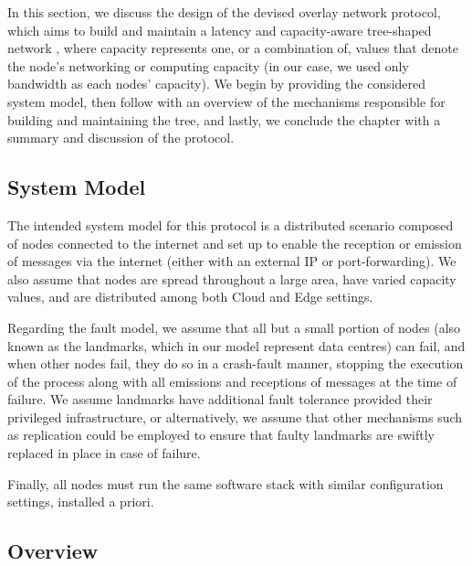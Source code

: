 


In this section, we discuss the design of the devised overlay network protocol, which aims to build and maintain a latency and capacity-aware tree-shaped network , where capacity represents one, or a combination of, values that denote the node's networking or computing capacity (in our case, we used only bandwidth as each nodes' capacity). We begin by providing the considered system model, then follow with an overview of the mechanisms responsible for building and maintaining the tree, and lastly, we conclude the chapter with a summary and discussion of the protocol.

\subsection{System Model}

The intended system model for this protocol is a distributed scenario composed of nodes connected to the internet and set up to enable the reception or emission of messages via the internet (either with an external IP or port-forwarding). We also assume that nodes are spread throughout a large area, have varied capacity values, and are distributed among both Cloud and Edge settings.

Regarding the fault model, we assume that all but a small portion of nodes (also known as the landmarks, which in our model represent data centres) can fail, and when other nodes fail, they do so in a crash-fault manner, stopping the execution of the process along with all emissions and receptions of messages at the time of failure. We assume landmarks have additional fault tolerance provided their privileged infrastructure, or alternatively, we assume that other mechanisms such as replication could be employed to ensure that faulty landmarks are swiftly replaced in place in case of failure. 
  
Finally, all nodes must run the same software stack with similar configuration settings, installed a priori.

\subsection{Overview}

